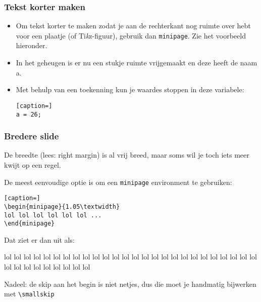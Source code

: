 \documentclass[fleqn,aspectratio=169,dutch,10pt]{beamer}
\begin{document}
\begin{frame}[fragile]
\frametitle{Tekst korter maken}
\begin{itemize}
\item Om tekst korter te maken zodat je aan de rechterkant nog ruimte over hebt voor een plaatje (of Ti\emph{k}z-figuur), gebruik dan \lstinline|minipage|. Zie het voorbeeld hieronder.
\end{itemize}
\bigskip
\begin{minipage}{0.5\linewidth}
\begin{itemize}
\item In het geheugen is er nu een stukje ruimte 
vrijgemaakt en deze heeft de naam a.
\item Met behulp van een toekenning kun je waardes 
stoppen in deze variabele:
\begin{lstlisting}[caption=]
a = 26;
\end{lstlisting}
\end{itemize}
\end{minipage}\hfil%
\begin{minipage}{0.2\linewidth}
\end{minipage}
\end{frame}


\begin{frame}[fragile]
\frametitle{Bredere slide}
\begin{itemize}
\item De breedte (lees: right margin) is al vrij breed, maar soms wil je toch iets meer kwijt op een regel.
\item De meest eenvoudige optie is om een \lstinline|minipage| environment te gebruiken:
\begin{lstlisting}[caption=]
\begin{minipage}{1.05\textwidth}
lol lol lol lol lol lol ...
\end{minipage}
\end{lstlisting}

\item Dat ziet er dan uit als:

\smallskip
\begin{minipage}{1.05\textwidth}
\item lol lol lol lol lol lol lol lol lol lol lol lol lol lol lol lol lol lol lol lol lol lol lol lol lol lol lol lol lol lol lol lol lol lol lol
\end{minipage}

\item Nadeel: de skip aan het begin is niet netjes, dus die moet je handmatig bijwerken met \lstinline|\smallskip|
\end{itemize}
\end{frame}
\end{document}
